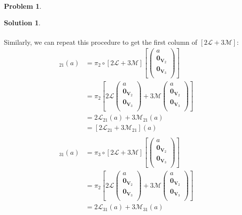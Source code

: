 \documentclass{article}
\theoremstyle{definition}
\newtheorem*{prob*}{Problem}
\newtheorem*{sln*}{Solution}
\newcommand{\V}{\mathbf{V}}
\newcommand{\lag}{\mathcal{L}}
\newcommand{\M}{\mathcal{M}}
\begin{document}
\begin{prob*}
\begin{sln*}
\begin{enumerate}
\begin{enumerate}
\begin{align*}
			\end{align*}
			Similarly, we can repeat this procedure to get the first column of $[2\lag + 3\M]$:
			\begin{align*}
			[2\lag + 3\M]_{21}(a) &= \pi_2 \circ [2\lag + 3\M]\left[\begin{pmatrix}
			a\\ \mathbf{0}_{\V_2} \\ \mathbf{0}_{\V_3}\\
			\end{pmatrix}\right]\\
			&= \pi_2 \left[2\lag \begin{pmatrix}
			a\\ \mathbf{0}_{\V_2} \\ \mathbf{0}_{\V_3}\\
			\end{pmatrix}+ 3\M \begin{pmatrix}
			a\\ \mathbf{0}_{\V_2} \\ \mathbf{0}_{\V_3}\\
			\end{pmatrix}\right]\\
			&= 2\lag_{21}(a) + 3\M_{21}(a)\\
			&= [2\lag_{21} + 3\M_{21}](a)\\
			\end{align*}
			\begin{align*}
			[2\lag + 3\M]_{31}(a) &= \pi_3 \circ [2\lag + 3\M]\left[\begin{pmatrix}
			a\\ \mathbf{0}_{\V_2} \\ \mathbf{0}_{\V_3}\\
			\end{pmatrix}\right]\\
			&= \pi_2 \left[2\lag \begin{pmatrix}
			a\\ \mathbf{0}_{\V_2} \\ \mathbf{0}_{\V_3}\\
			\end{pmatrix} + 3\M \begin{pmatrix}
			a\\ \mathbf{0}_{\V_2} \\ \mathbf{0}_{\V_3}\\
			\end{pmatrix}\right]\\
			&= 2\lag_{31}(a) + 3\M_{31}(a)\\

\end{align*}
\end{enumerate}
\end{enumerate}
\end{sln*}
\end{prob*}
\end{document}
